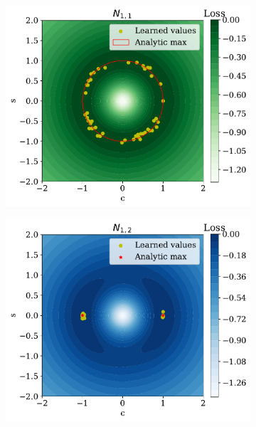\begin{figure}
    \centering
    \begin{subfigure}[b]{0.45\textwidth}
        \centering
        \includegraphics[width=\textwidth]{figures/chapter-09/SO2symmAnalytic.pdf}
        \caption{}
        \label{fig:SO2-i}
    \end{subfigure}
    \hfill
    \begin{subfigure}[b]{0.45\textwidth}
        \centering
        \includegraphics[width=\textwidth]{figures/chapter-09/4O2asymmAnalytic.pdf}
        \caption{}
        \label{fig:SO2-iii}

\end{subfigure}
\end{figure}
